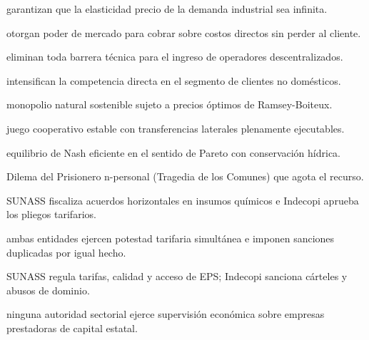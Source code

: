 \begin{opts}
    \item garantizan que la elasticidad precio de la demanda industrial sea infinita.
    \item otorgan poder de mercado para cobrar sobre costos directos sin perder al cliente.
    \item eliminan toda barrera técnica para el ingreso de operadores descentralizados.
    \item intensifican la competencia directa en el segmento de clientes no domésticos.
\end{opts}

\begin{opts}
    \item monopolio natural sostenible sujeto a precios óptimos de Ramsey-Boiteux.
    \item juego cooperativo estable con transferencias laterales plenamente ejecutables.
    \item equilibrio de Nash eficiente en el sentido de Pareto con conservación hídrica.
    \item Dilema del Prisionero n-personal (Tragedia de los Comunes) que agota el recurso.
\end{opts}

\begin{opts}
    \item SUNASS fiscaliza acuerdos horizontales en insumos químicos e Indecopi aprueba los pliegos tarifarios.
    \item ambas entidades ejercen potestad tarifaria simultánea e imponen sanciones duplicadas por igual hecho.
    \item SUNASS regula tarifas, calidad y acceso de EPS; Indecopi sanciona cárteles y abusos de dominio.
    \item ninguna autoridad sectorial ejerce supervisión económica sobre empresas prestadoras de capital estatal.
\end{opts}


